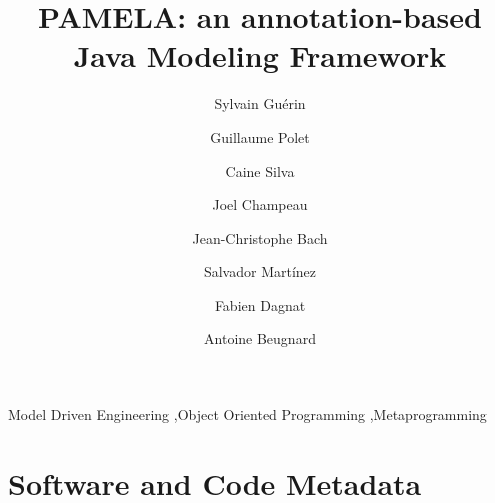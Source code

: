 \documentclass[preprint]{elsarticle}
\begin{document}
\begin{frontmatter}

\title{PAMELA: an annotation-based Java Modeling Framework}



\author[mymainaddress]{Sylvain Guérin}

\author[mymainaddress]{Guillaume Polet}

\author[mymainaddress]{Caine Silva}

\author[mymainaddress]{Joel Champeau}

\author[mysecondaryaddress]{Jean-Christophe Bach}

\author[mysecondaryaddress]{Salvador Mart\'inez}

\author[mysecondaryaddress]{Fabien Dagnat}

\author[mysecondaryaddress]{Antoine Beugnard}

\address[mymainaddress]{ENSTA Bretagne, Lab-STICC, UMR 6285, Brest, France}%
\address[mysecondaryaddress]{IMT Atlantique, Lab-STICC, UMR 6285, Brest, France}





\begin{keyword}
Model Driven Engineering \sep Object Oriented Programming \sep Metaprogramming 
\end{keyword}

\end{frontmatter}

\clearpage
\section*{Software and Code Metadata}
\label{}
\end{document}
